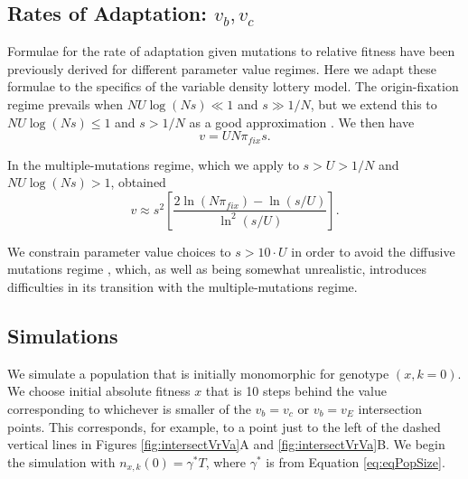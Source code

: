 \documentclass[9pt,twocolumn,twoside,lineno]{gsajnl}
\begin{document}
\subsection{Rates of Adaptation: $v_b , v_c$}\label{sec:RatesAdaptation}

Formulae for the rate of adaptation given mutations to relative fitness have been previously derived for different parameter value regimes. Here we adapt these formulae to the specifics of the variable density lottery model. The origin-fixation regime prevails when $NU\log(Ns) \ll 1$ and $s \gg 1/N$, but we extend this to $NU\log(Ns) \leq 1$ and $s>1/N$ as a good approximation \citep{good2012distribution,desai2007beneficial}. We then have
\begin{equation}\label{eq:OFrateOfAdapt}
v = U N \pi_{fix} s.
\end{equation}

In the multiple-mutations regime, which we apply to $s > U > 1/N$ and $NU\log(Ns) > 1$, \cite{desai2007beneficial} obtained
\begin{equation}\label{eq:DFrateOfAdapt}
v \approx s^{2}\left[ \frac{2\ln(N \pi_{fix}) - \ln(s/U)}{\ln^{2}(s/U)}\right].
\end{equation}

We constrain parameter value choices to $s>10\cdot U$ in order to avoid the diffusive mutations regime \citep{hallatschek2011noisy, gomezetal2020}, which, as well as being somewhat unrealistic, introduces difficulties in its transition with the multiple-mutations regime.

\subsection{Simulations}\label{sec:Simulations}

We simulate a population that is initially monomorphic for genotype $(x,k=0)$. We choose initial absolute fitness $x$ that is 10 steps behind the value corresponding to whichever is smaller of the $v_b=v_c$ or $v_b=v_E$ intersection points. This corresponds, for example, to a point just to the left of the dashed vertical lines in Figures \ref{fig:intersectVrVa}A and  \ref{fig:intersectVrVa}B. We begin the simulation with $n_{x,k}(0)=\gamma^*T$, where $\gamma^*$ is from Equation \eqref{eq:eqPopSize}.
\end{document}
